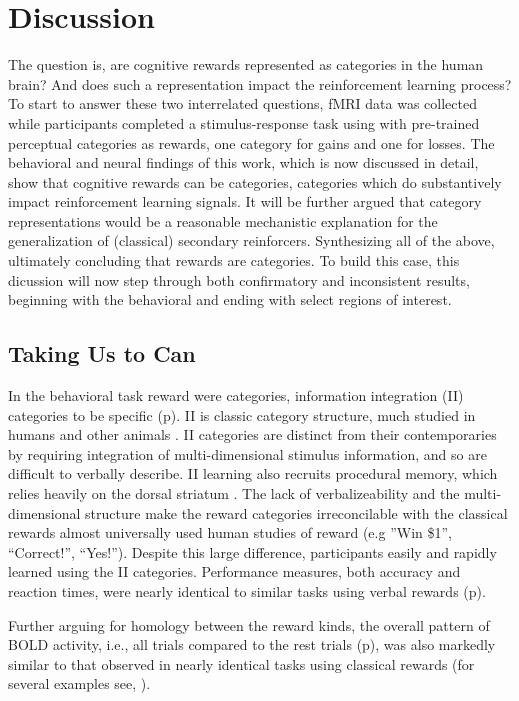 \section{Discussion} %
\label{sec:dicussion}
The question is, are cognitive rewards represented as categories in the human brain?  And does such a representation impact the reinforcement learning process?  To start to answer these two interrelated questions, fMRI data was collected while participants completed a stimulus-response task using with pre-trained perceptual categories as rewards, one category for gains and one for losses.  The behavioral and neural findings of this work, which is now discussed in detail, show that cognitive rewards can be categories, categories which do substantively impact reinforcement learning signals.  It will be further argued that category representations would be a reasonable mechanistic explanation for the generalization of (classical) secondary reinforcers.  Synthesizing all of the above, ultimately concluding that rewards are categories.  To build this case, this dicussion will now step through both confirmatory and inconsistent results, beginning with the behavioral and ending with select regions of interest.

\subsection{Taking Us to Can}
\label{sub:tocan}
In the behavioral task reward were categories, information integration (II) categories to be specific (p\pageref{subsub:whatwhen}).  II is classic category structure, much studied in humans and other animals \cite{Smith:2011p9101,Ashby:2011p9148,Smith:2010p9713}.  II categories are distinct from their contemporaries by requiring integration of multi-dimensional stimulus information, and so are difficult to verbally describe. II learning also recruits procedural memory, which relies heavily on the dorsal striatum \cite{Ashby:1998p9716}.   The lack of verbalizeability and the multi-dimensional structure make the reward categories irreconcilable with the classical rewards almost universally used human studies of reward (e.g ''Win \$1'', ``Correct!'', ``Yes!'').  Despite this large difference, participants easily and rapidly learned using the II categories.  Performance measures, both accuracy and reaction times, were nearly identical to similar tasks using verbal rewards (p\pageref{subsub:wellbehaved}).  

Further arguing for homology between the reward kinds, the overall pattern of BOLD activity, i.e., all trials compared to the rest trials (p\pageref{sub:blob}), was also markedly similar to that observed in nearly identical tasks using classical rewards (for several examples see, ).


